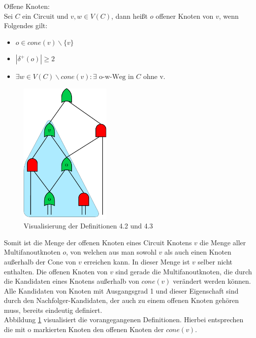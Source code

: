 \documentclass[11pt, a4paper, german]{article}
\begin{document}
\begin{definition}{Offene Knoten:}\\
	Sei $C$ ein Circuit und $v,w \in V(C)$, dann heißt $o$ offener Knoten von $v$, wenn Folgendes gilt: 
	\begin{itemize}
		\item $ o \in cone(v)\backslash \{ v \} $
		\item $| \delta ^{+}(o)| \geq 2$
		\item $ \exists w \in V(C) \backslash cone(v) : \exists \text{ o-w-Weg in } C \text{ ohne v} $.
	\end{itemize}	
\end{definition}
 \begin{figure}
		\includegraphics[height = 7cm]{pictures/compiled/cone}
		\caption{Visualisierung der Definitionen 4.2 und 4.3}
		\label{bild:cone}
\end{figure}
Somit ist die Menge der offenen Knoten eines Circuit Knotens $v$ die Menge aller Multifanoutknoten $o$, von welchen aus man sowohl $v$ als auch einen Knoten außerhalb der Cone von $v$ erreichen kann. In dieser Menge ist $v$ selber nicht enthalten. Die offenen Knoten von $v$ sind gerade die Multifanoutknoten, die durch die Kandidaten eines Knotens außerhalb von $cone(v)$ verändert werden können. Alle Kandidaten von  Knoten mit Ausgangsgrad 1 und dieser Eigenschaft sind durch den Nachfolger-Kandidaten, der auch zu einem offenen Knoten gehören muss, bereits eindeutig definiert. \\
Abbildung \ref{bild:cone} visualisiert die vorangegangenen Definitionen. Hierbei entsprechen die  mit o markierten Knoten den offenen Knoten der $cone(v)$.
\end{document}

